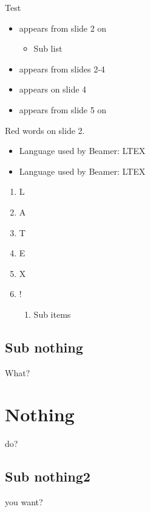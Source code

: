 \documentclass{beamer}
\begin{document}
\begin{frame}{Test}
    \begin{itemize}
        \item<2-> appears from slide 2 on
        \begin{itemize}
            \item Sub list
        \end{itemize}
        \item<2-4> appears from slides 2-4
        \item<4> appears on slide 4
        \item<5-> appears from slide 5 on
    \end{itemize}


     
    \alert<2>{Red words on slide 2.}  %


    \begin{itemize}
        \item Language used by Beamer: LTEX
        \item Language used by Beamer: LTEX
    \end{itemize}

    \begin{enumerate}[<+-| alert@+>]
        \item L
        \item A
        \item T
        \item E
        \item X
        \item !
        \begin{enumerate}
            \item Sub items
        \end{enumerate}
    \end{enumerate}
\end{frame}

\subsection{Sub nothing}
\begin{frame}{What?}
\end{frame}

\section{Nothing}
\begin{frame}{do?}
\end{frame}

\subsection{Sub nothing2}
\begin{frame}{you want?}
\end{frame}


\end{document}
